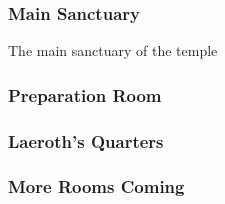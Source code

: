 \begin{multicols*}{2}
\subsubsection{Main Sanctuary}
The main sanctuary of the temple

\subsubsection{Preparation Room}

\subsubsection{Laeroth's Quarters}

\subsubsection{More Rooms Coming}
\end{multicols*}


\pagebreak
